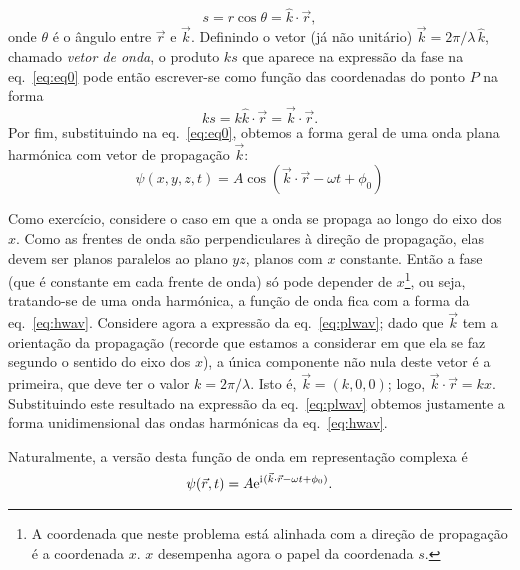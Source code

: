 \begin{equation*}
  s = r\cos\theta = \hat k\cdot\vec r,
\end{equation*}
onde $\theta$ é o ângulo entre $\vec r$ e $\vec k$.  Definindo o vetor (já não
unitário) $\vec k=2\pi/\lambda\,\hat k$, chamado \emph{vetor de onda}, o produto
$ks$ que aparece na expressão da fase na eq.~\eqref{eq:eq0} pode então
escrever-se como função das coordenadas do ponto $P$ na forma
\begin{equation*}
  ks=k\hat k\cdot \vec r=\vec k\cdot\vec r.
\end{equation*}
Por fim, substituindo na eq.~\eqref{eq:eq0}, obtemos a forma geral de uma onda
plana harmónica com vetor de propagação $\vec k$:
\begin{equation} \label{eq:plwav}
\psi(x,y,z,t)=A\cos(\vec k\cdot\vec r-\omega t+\phi_0)
\end{equation}

Como exercício, considere o caso em que a onda se propaga ao longo do eixo dos
$x$. Como as frentes de onda são perpendiculares à direção de propagação, elas
devem ser planos paralelos ao plano $yz$, planos com $x$ constante. Então a fase
(que é constante em cada frente de onda) só pode depender de $x$\footnote{A
  coordenada que neste problema está alinhada com a direção de propagação é a
coordenada $x$. $x$ desempenha agora o papel da coordenada $s$.}, ou seja,
tratando-se de uma onda harmónica, a função de onda fica com a forma da
eq.~\eqref{eq:hwav}. Considere agora a expressão da eq.~\eqref{eq:plwav}; dado
que $\vec k$ tem a orientação da propagação (recorde que estamos a considerar em
que ela se faz segundo o sentido do eixo dos $x$), a única componente não nula
deste vetor é a primeira, que deve ter o valor $k=2\pi/\lambda$. Isto é, $\vec
k=(k,0,0)$; logo, $\vec k\cdot\vec r=kx$.  Substituindo este resultado na
expressão da eq.~\eqref{eq:plwav} obtemos justamente a forma unidimensional das
ondas harmónicas da eq.~\eqref{eq:hwav}.

Naturalmente, a versão desta função de onda em representação complexa é
\begin{equation}\label{eq:phwfexp}
  \psi(\vec r,t)=A\e^{\iu(\vec k\cdot \vec r-\omega t+\phi_0)}.
\end{equation}

